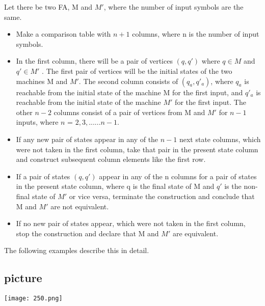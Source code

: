 \documentclass{article}
\begin{document}
  \vspace*{0.5cm}
 Let there be two FA, M and $M'$, where the number of input symbols are the same.\\
 \small{
  \begin{itemize}
    \item Make a comparison table with $n + 1$ columns, where n is the number of input symbols.\\
    \item In the first column, there will be a pair of vertices $(q, q')$ where $q \in M$ and $q' \in M'$ . The first pair
of vertices will be the initial states of the two machines M and $M'$. The second column consists of
$(q_a, q'_a)$, where $q_a$ is reachable from the initial state of the machine M for the first input, and $q'_a$ is
reachable from the initial state of the machine $M'$ for the first input. The other $n - 2$ columns consist
of a pair of vertices from M and $M'$ for $n - 1$ inputs, where $n$ = $2, 3,...... n - 1$.\\

  \end{itemize}
}

\small{
\begin{itemize}
  \item If any new pair of states appear in any of the $n - 1$ next state columns, which were not taken in the
first column, take that pair in the present state column and construct subsequent column elements
like the first row.\\
  \item If a pair of states $(q,q')$ appear in any of the n columns for a pair of states in the present state column,
where q is the final state of M and $q'$ is the non-final state of $M'$ or vice versa, terminate the
construction and conclude that M and $M'$ are not equivalent.\\
  \item If no new pair of states appear, which were not taken in the first column, stop the construction and
declare that M and $M'$ are equivalent.\\
\end{itemize}
}

\vspace*{0.2cm}
The following examples describe this in detail.\\

\begin{center}
  \section{picture}
\texttt{[image: 250.png]}
\end{center}
\end{document}
